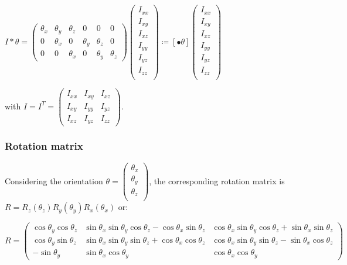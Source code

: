 \documentclass[a4paper, 11pt]{article}
\begin{document}
{\centering
 $ I \ast \theta =
 \begin{pmatrix}
  \theta_x & \theta_y & \theta_z & 0        & 0        & 0        \\
  0        & \theta_x & 0        & \theta_y & \theta_z & 0        \\
  0        & 0        & \theta_x & 0        & \theta_y & \theta_z
 \end{pmatrix}
 \begin{pmatrix}
  I_{xx} \\
  I_{xy} \\
  I_{xz} \\
  I_{yy} \\
  I_{yz} \\
  I_{zz} \\
 \end{pmatrix}
 \coloneqq \left[ \bullet \theta \right]
 \begin{pmatrix}
  I_{xx} \\
  I_{xy} \\
  I_{xz} \\
  I_{yy} \\
  I_{yz} \\
  I_{zz} \\
 \end{pmatrix}$
 \par}

with $I = I^T =
\begin{pmatrix}
 I_{xx} & I_{xy} & I_{xz} \\
 I_{xy} & I_{yy} & I_{yz} \\
 I_{xz} & I_{yz} & I_{zz}
\end{pmatrix}
$.


\subsubsection{Rotation matrix}

\label{rotation}

Considering the orientation $\theta =
\begin{pmatrix}
 \theta_x \\
 \theta_y \\
 \theta_z \\
\end{pmatrix}
$,
the corresponding rotation matrix is $R = R_z(\theta_z)R_y(\theta_y)R_x(\theta_x)$ or:

\begin{equation*}
 R =
 \begin{pmatrix}
  \cos \theta_y \cos \theta_z & \sin \theta_x \sin \theta_y \cos \theta_z - \cos \theta_x \sin \theta_z & \cos \theta_x \sin \theta_y \cos \theta_z + \sin \theta_x \sin \theta_z \\
  \cos \theta_y \sin \theta_z & \sin \theta_x \sin \theta_y \sin \theta_z + \cos \theta_x \cos \theta_z & \cos \theta_x \sin \theta_y \sin \theta_z - \sin \theta_x \cos \theta_z \\
  - \sin \theta_y             & \sin \theta_x \cos \theta_y                                             & \cos \theta_x \cos \theta_y
 \end{pmatrix}
\end{equation*}
\end{document}
